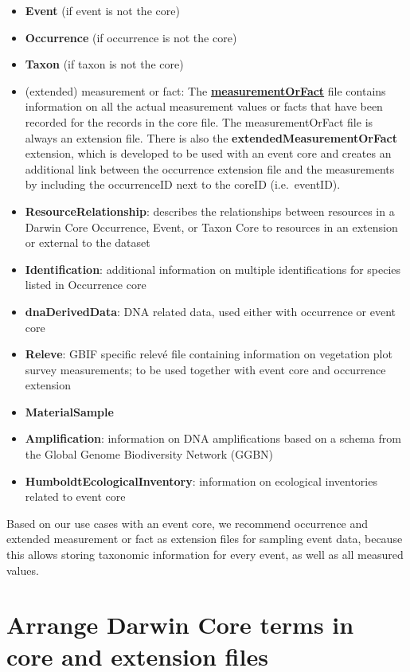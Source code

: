 \documentclass[
  oneside]{book}
\begin{document}
\begin{itemize}
\item
  \textbf{Event} (if event is not the core)
\item
  \textbf{Occurrence} (if occurrence is not the core)
\item
  \textbf{Taxon} (if taxon is not the core)
\item
  (extended) measurement or fact: The \hyperref[measurementorfact]{\textbf{measurementOrFact}} file contains information on all the actual measurement values or facts that have been recorded for the records in the core file. The measurementOrFact file is always an extension file. There is also the \textbf{extendedMeasurementOrFact} extension, which is developed to be used with an event core and creates an additional link between the occurrence extension file and the measurements by including the occurrenceID next to the coreID (i.e.~eventID).
\item
  \textbf{ResourceRelationship}: describes the relationships between resources in a Darwin Core Occurrence, Event, or Taxon Core to resources in an extension or external to the dataset
\item
  \textbf{Identification}: additional information on multiple identifications for species listed in Occurrence core
\item
  \textbf{dnaDerivedData}: DNA related data, used either with occurrence or event core
\item
  \textbf{Releve}: GBIF specific relevé file containing information on vegetation plot survey measurements; to be used together with event core and occurrence extension
\item
  \textbf{MaterialSample}
\item
  \textbf{Amplification}: information on DNA amplifications based on a schema from the Global Genome Biodiversity Network (GGBN)
\item
  \textbf{HumboldtEcologicalInventory}: information on ecological inventories related to event core
\end{itemize}

Based on our use cases with an event core, we recommend occurrence and extended measurement or fact as extension files for sampling event data, because this allows storing taxonomic information for every event, as well as all measured values.

\section{Arrange Darwin Core terms in core and extension files}\label{arrange-darwin-core-terms-in-core-and-extension-files}
\end{document}

